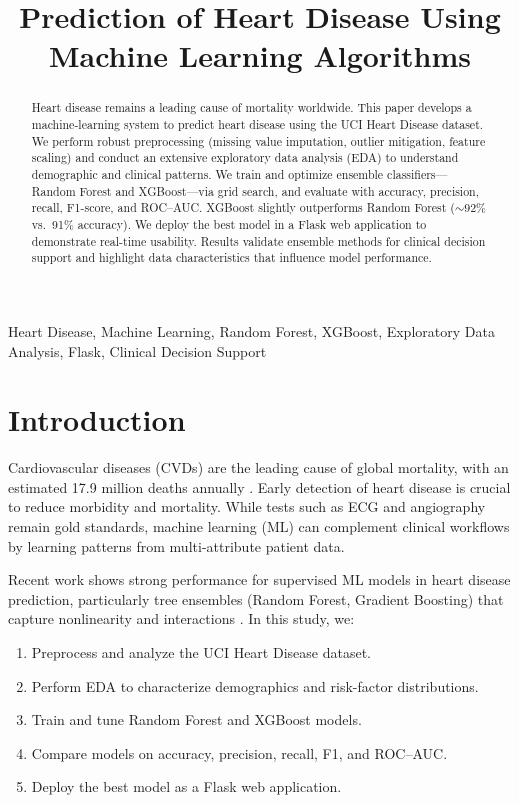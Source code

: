 \documentclass[conference]{IEEEtran}
\title{Prediction of Heart Disease Using Machine Learning Algorithms}
\author{
\IEEEauthorblockN{HMRS Samaranayaka}
\IEEEauthorblockA{Department of Computer Science \& Software Engineering\\
NSBM Green University, Homagama, Sri Lanka\\
\texttt{hmrssamaranayaka.students.nsbm.ac.lk}}
}
\begin{document}
\maketitle

\begin{abstract}
Heart disease remains a leading cause of mortality worldwide. This paper develops a machine-learning system to predict heart disease using the UCI Heart Disease dataset. We perform robust preprocessing (missing value imputation, outlier mitigation, feature scaling) and conduct an extensive exploratory data analysis (EDA) to understand demographic and clinical patterns. We train and optimize ensemble classifiers---Random Forest and XGBoost---via grid search, and evaluate with accuracy, precision, recall, F1-score, and ROC--AUC. XGBoost slightly outperforms Random Forest (\(\sim\)92\% vs.\ 91\% accuracy). We deploy the best model in a Flask web application to demonstrate real-time usability. Results validate ensemble methods for clinical decision support and highlight data characteristics that influence model performance.
\end{abstract}

\begin{IEEEkeywords}
Heart Disease, Machine Learning, Random Forest, XGBoost, Exploratory Data Analysis, Flask, Clinical Decision Support
\end{IEEEkeywords}

\section{Introduction}
Cardiovascular diseases (CVDs) are the leading cause of global mortality, with an estimated 17.9 million deaths annually \cite{who2021}. Early detection of heart disease is crucial to reduce morbidity and mortality. While tests such as ECG and angiography remain gold standards, machine learning (ML) can complement clinical workflows by learning patterns from multi-attribute patient data.

Recent work shows strong performance for supervised ML models in heart disease prediction, particularly tree ensembles (Random Forest, Gradient Boosting) that capture nonlinearity and interactions \cite{zhang2021, chen2016xgb}. In this study, we:
\begin{enumerate}
\item Preprocess and analyze the UCI Heart Disease dataset.
\item Perform EDA to characterize demographics and risk-factor distributions.
\item Train and tune Random Forest and XGBoost models.
\item Compare models on accuracy, precision, recall, F1, and ROC--AUC.
\item Deploy the best model as a Flask web application.
\end{enumerate}
\end{document}
